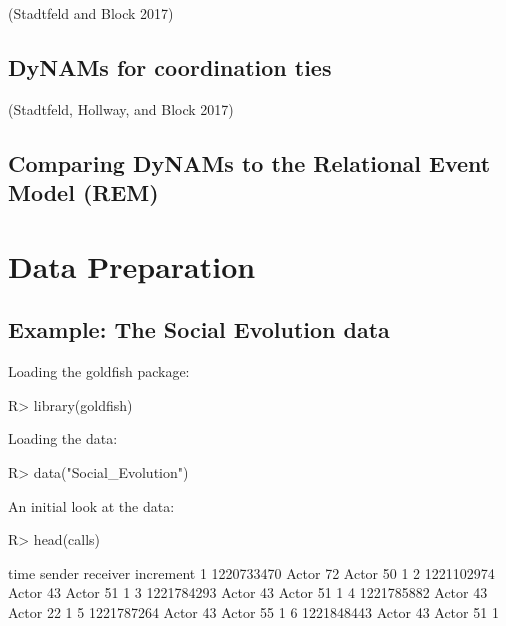 \documentclass[article]{jss}
\begin{document}
(Stadtfeld and Block 2017)

\subsection[DyNAMs for coordination ties]{DyNAMs for coordination ties} \label{subsec:DyNAMs_coordties}

(Stadtfeld, Hollway, and Block 2017)


\subsection[Comparing DyNAMs to the Relational Event Model (REM)]{Comparing DyNAMs to the Relational Event Model (REM)} \label{subsec:DyNAMs_REM}




\section[Data preparation]{Data Preparation} \label{sec:data_prep}


\subsection[Example: The Social Evolution data]{Example: The Social Evolution data} \label{subsec:load}




Loading the goldfish package:

%
\begin{Schunk}
\begin{Sinput}
R> library(goldfish)
\end{Sinput}
\end{Schunk}
%
%
%
Loading the data:
%
\begin{Schunk}
\begin{Sinput}
R> data("Social_Evolution")
\end{Sinput}
\end{Schunk}
%

An initial look at the data:

%
\begin{Schunk}
\begin{Sinput}
R> head(calls)
\end{Sinput}
\begin{Soutput}
        time   sender receiver increment
1 1220733470 Actor 72 Actor 50         1
2 1221102974 Actor 43 Actor 51         1
3 1221784293 Actor 43 Actor 51         1
4 1221785882 Actor 43 Actor 22         1
5 1221787264 Actor 43 Actor 55         1
6 1221848443 Actor 43 Actor 51         1
\end{Soutput}
\end{Schunk}
%
\end{document}
